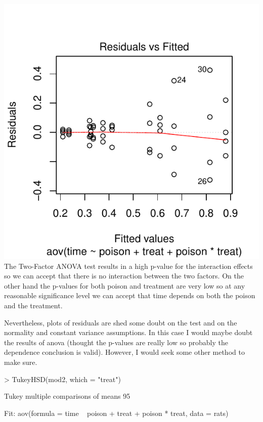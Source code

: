 \documentclass[11pt,letterpaper]{article}
\begin{document}
\begin{enumerate}
\includegraphics{midterm2-006}
The Two-Factor ANOVA test results in a high p-value for the interaction effects so we can accept that there is no interaction between the two factors. On the other hand the p-values for both poison and treatment are very low so at any reasonable significance level we can accept that time depends on both the poison and the treatment.

Nevertheless, plots of residuals are shed some doubt on the test and on the normality and constant variance assumptions. In this case I would maybe doubt the results of anova (thought the p-values are really low so probably the dependence conclusion is valid). However, I would seek some other method to make sure.

\begin{Schunk}
\begin{Sinput}
> TukeyHSD(mod2, which = "treat")
\end{Sinput}
\begin{Soutput}
  Tukey multiple comparisons of means
    95%

Fit: aov(formula = time ~ poison + treat + poison * treat, data = rats)


\end{Soutput}
\end{Schunk}
\end{enumerate}
\end{document}
